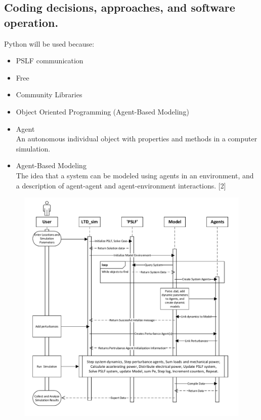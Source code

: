 \documentclass[14pt, unknownkeysallowed]{beamer}
\begin{document}
\subsection{Coding decisions, approaches, and software operation.}
\begin{frame}
Python will be used because:
\begin{itemize}
	\item PSLF communication
	\item Free
	\item Community Libraries
	\item Object Oriented Programming (Agent-Based Modeling)
\end{itemize}
\end{frame}
\begin{frame}
\begin{itemize}
	\item Agent\\ An autonomous individual object with properties and methods in a computer simulation.
	\item Agent-Based Modeling\\ The idea that a system can be modeled using agents in an environment, and a description of agent-agent and agent-environment interactions. \tiny[2]
\end{itemize}
\end{frame}
\begin{frame}
\vspace{-.75em}
\begin{figure}
	\includegraphics[height=1.07\textheight]{systemInit01.pdf}
\end{figure}
\end{frame}
\end{document}
